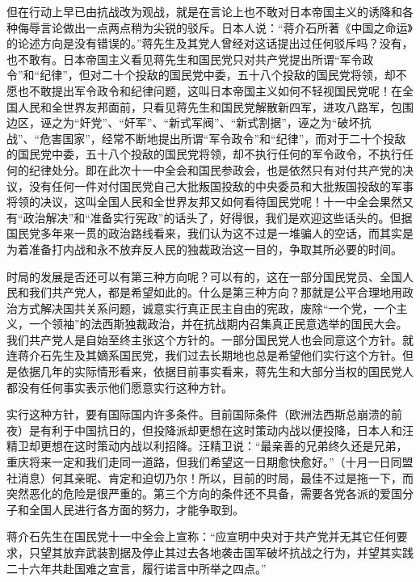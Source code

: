 但在行动上早已由抗战改为观战，就是在言论上也不敢对日本帝国主义的诱降和各种侮辱言论做出一点两点稍为尖锐的驳斥。日本人说：“蒋介石所著《中国之命运》的论述方向是没有错误的。”蒋先生及其党人曾经对这话提出过任何驳斥吗？没有，也不敢有。日本帝国主义看见蒋先生和国民党只对共产党提出所谓“军令政令”和“纪律”，但对二十个投敌的国民党中委，五十八个投敌的国民党将领，却不愿也不敢提出军令政令和纪律问题，这叫日本帝国主义如何不轻视国民党呢！在全国人民和全世界友邦面前，只看见蒋先生和国民党解散新四军，进攻八路军，包围边区，诬之为“奸党”、“奸军”、“新式军阀”、“新式割据”，诬之为“破坏抗战”、“危害国家”，经常不断地提出所谓“军令政令”和“纪律”，而对于二十个投敌的国民党中委，五十八个投敌的国民党将领，却不执行任何的军令政令，不执行任何的纪律处分。即在此次十一中全会和国民参政会，也是依然只有对付共产党的决议，没有任何一件对付国民党自己大批叛国投敌的中央委员和大批叛国投敌的军事将领的决议，这叫全国人民和全世界友邦又如何看待国民党呢！十一中全会果然又有“政治解决”和“准备实行宪政”的话头了，好得很，我们是欢迎这些话头的。但据国民党多年来一贯的政治路线看来，我们认为这不过是一堆骗人的空话，而其实是为着准备打内战和永不放弃反人民的独裁政治这一目的，争取其所必要的时间。

时局的发展是否还可以有第三种方向呢？可以有的，这在一部分国民党员、全国人民和我们共产党人，都是希望如此的。什么是第三种方向？那就是公平合理地用政治方式解决国共关系问题，诚意实行真正民主自由的宪政，废除“一个党，一个主义，一个领袖”的法西斯独裁政治，并在抗战期内召集真正民意选举的国民大会。我们共产党人是自始至终主张这个方针的。一部分国民党人也会同意这个方针。就连蒋介石先生及其嫡系国民党，我们过去长期地也总是希望他们实行这个方针。但是依据几年的实际情形看来，依据目前事实看来，蒋先生和大部分当权的国民党人都没有任何事实表示他们愿意实行这种方针。

实行这种方针，要有国际国内许多条件。目前国际条件（欧洲法西斯总崩溃的前夜）是有利于中国抗日的，但投降派却更想在这时策动内战以便投降，日本人和汪精卫却更想在这时策动内战以利招降。汪精卫说：“最亲善的兄弟终久还是兄弟，重庆将来一定和我们走同一道路，但我们希望这一日期愈快愈好。”（十月一日同盟社消息）何其亲昵、肯定和迫切乃尔！所以，目前的时局，最佳不过是拖一下，而突然恶化的危险是很严重的。第三个方向的条件还不具备，需要各党各派的爱国分子和全国人民进行各方面的努力，才能争取到。

蒋介石先生在国民党十一中全会上宣称：“应宣明中央对于共产党并无其它任何要求，只望其放弃武装割据及停止其过去各地袭击国军破坏抗战之行为，并望其实践二十六年共赴国难之宣言，履行诺言中所举之四点。”

